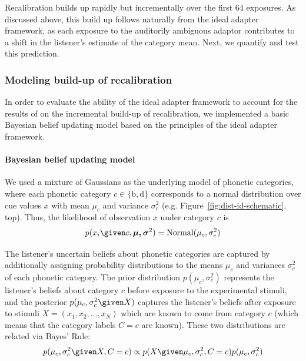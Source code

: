 Recalibration builds up rapidly but incrementally over the first 64 exposures.  As discussed above, this build up follows naturally from the ideal adapter framework, as each exposure to the auditorily ambiguous adaptor contributes to a shift in the listener's estimate of the category mean.
Next, we quantify and test this prediction.


\subsubsection{Modeling build-up of recalibration}
\label{sec:modeling-build-up}

In order to evaluate the ability of the ideal adapter framework to account for the results of \textcite{Vroomen2007} on the incremental build-up of recalibration, we implemented a basic Bayesian belief updating model based on the principles of the ideal adapter framework.

\paragraph{Bayesian belief updating model}
\label{sec:bayes-beli-updat}

We used a mixture of Gaussians as the underlying model of phonetic categories, where each phonetic category $c \in \{\mathrm b, \mathrm d\}$ corresponds to a normal distribution over cue values $x$ with mean $\mu_c$ and variance $\sigma^2_c$ (e.g. Figure~\ref{fig:dist-id-schematic}, top).  Thus, the likelihood of observation $x$ under category $c$ is
\begin{equation}
  \label{eq:4}
  p(x_i \given c, \boldsymbol{\mu, \sigma}^2) = \mathrm{Normal} (\mu_{c}, \sigma^2_{c})
\end{equation}

The listener's uncertain beliefs about phonetic categories are captured by additionally assigning probability distributions to the means $\mu_c$ and variances $\sigma^2_c$ of each phonetic category.  The prior distribution $p(\mu_c, \sigma^2_c)$ represents the listener's beliefs about category $c$ before exposure to the experimental stimuli, and the posterior $p(\mu_c, \sigma^2_c \given X)$ captures the listener's beliefs after exposure to stimuli $X = (x_1, x_2, \ldots, x_N)$ which are known to come from category $c$ (which means that the category labels $C=c$ are known).  These two distributions are related via Bayes' Rule:
\begin{equation}
  \label{eq:5}
  p(\mu_c, \sigma^2_c \given X, C=c) \propto p(X\given \mu_c, \sigma^2_c, C=c) p(\mu_c, \sigma^2_c)
\end{equation}


